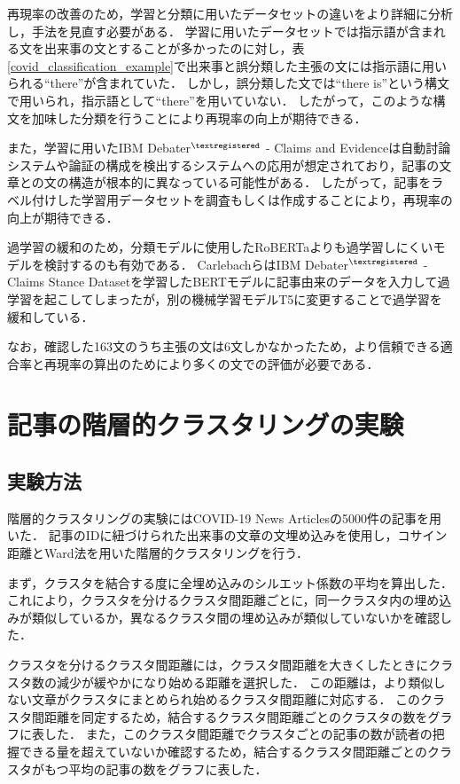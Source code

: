 \documentclass[12pt,a4j]{jreport}
\begin{document}
再現率の改善のため，学習と分類に用いたデータセットの違いをより詳細に分析し，手法を見直す必要がある．
学習に用いたデータセットでは指示語が含まれる文を出来事の文とすることが多かったのに対し，表\ref{covid_classification_example}で出来事と誤分類した主張の文には指示語に用いられる``there''が含まれていた．
しかし，誤分類した文では``there is''という構文で用いられ，指示語として``there''を用いていない．
したがって，このような構文を加味した分類を行うことにより再現率の向上が期待できる．

また，学習に用いたIBM Debater$^{\textregistered}$ - Claims and Evidenceは自動討論システムや論証の構成を検出するシステムへの応用が想定されており，記事の文章との文の構造が根本的に異なっている可能性がある．
したがって，記事をラベル付けした学習用データセットを調査もしくは作成することにより，再現率の向上が期待できる．

過学習の緩和のため，分類モデルに使用したRoBERTaよりも過学習しにくいモデルを検討するのも有効である．
CarlebachらはIBM Debater$^{\textregistered}$ - Claims Stance Datasetを学習したBERTモデルに記事由来のデータを入力して過学習を起こしてしまったが，別の機械学習モデルT5に変更することで過学習を緩和している\cite{carlebach_news_2020}．

なお，確認した163文のうち主張の文は6文しかなかったため，より信頼できる適合率と再現率の算出のためにより多くの文での評価が必要である．


\section{記事の階層的クラスタリングの実験}
\label{section_article_clustering_experiment}

\subsection{実験方法}

階層的クラスタリングの実験にはCOVID-19 News Articlesの5000件の記事を用いた．
記事のIDに紐づけられた出来事の文章の文埋め込みを使用し，コサイン距離とWard法を用いた階層的クラスタリングを行う．

まず，クラスタを結合する度に全埋め込みのシルエット係数の平均を算出した．
これにより，クラスタを分けるクラスタ間距離ごとに，同一クラスタ内の埋め込みが類似しているか，異なるクラスタ間の埋め込みが類似していないかを確認した．

クラスタを分けるクラスタ間距離には，クラスタ間距離を大きくしたときにクラスタ数の減少が緩やかになり始める距離を選択した．
この距離は，より類似しない文章がクラスタにまとめられ始めるクラスタ間距離に対応する．
このクラスタ間距離を同定するため，結合するクラスタ間距離ごとのクラスタの数をグラフに表した．
また，このクラスタ間距離でクラスタごとの記事の数が読者の把握できる量を超えていないか確認するため，結合するクラスタ間距離ごとのクラスタがもつ平均の記事の数をグラフに表した．
\end{document}
